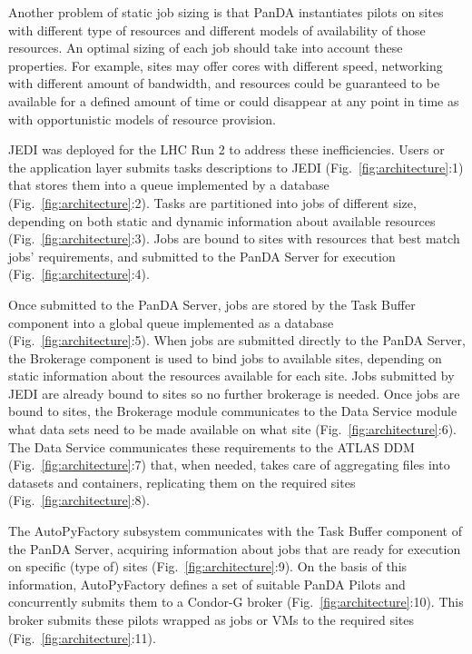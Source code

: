 Another problem of static job sizing is that PanDA instantiates pilots on sites
with different type of resources and different models of availability of those
resources. An optimal sizing of each job should take into account these
properties. For example, sites may offer cores with different speed, networking
with different amount of bandwidth, and resources could be guaranteed to be
available for a defined amount of time or could disappear at any point in time
as with opportunistic models of resource provision.

JEDI was deployed for the LHC Run 2 to address these inefficiencies. Users or
the application layer submits tasks descriptions to JEDI
(Fig.~\ref{fig:architecture}:1) that stores them into a queue implemented by a
database (Fig.~\ref{fig:architecture}:2). Tasks are partitioned into jobs of
different size, depending on both static and dynamic information about available
resources (Fig.~\ref{fig:architecture}:3). Jobs are bound to sites with
resources that best match jobs' requirements, and submitted to the PanDA Server
for execution (Fig.~\ref{fig:architecture}:4).

Once submitted to the PanDA Server, jobs are stored by the Task Buffer component
into a global queue implemented as a  database (Fig.~\ref{fig:architecture}:5).
When jobs are submitted directly to the PanDA Server, the Brokerage component is
used to bind jobs to available sites, depending on static information about the
resources available for each site. Jobs submitted by JEDI are already bound to
sites so no further brokerage is needed. Once jobs are bound to sites, the
Brokerage module communicates to the Data Service module what data sets need to
be made available on what site (Fig.~\ref{fig:architecture}:6). The Data Service
communicates these requirements to the ATLAS DDM (Fig.~\ref{fig:architecture}:7)
that, when needed, takes care of aggregating files into datasets and containers,
replicating them on the required sites (Fig.~\ref{fig:architecture}:8).

The AutoPyFactory subsystem communicates with the Task Buffer component of the
PanDA Server, acquiring information about jobs that are ready for execution on
specific (type of) sites (Fig.~\ref{fig:architecture}:9). On the basis of this
information, AutoPyFactory defines a set of suitable PanDA Pilots and
concurrently submits them to a Condor-G broker (Fig.~\ref{fig:architecture}:10).
This broker submits these pilots wrapped as jobs or VMs to the required sites
(Fig.~\ref{fig:architecture}:11).

